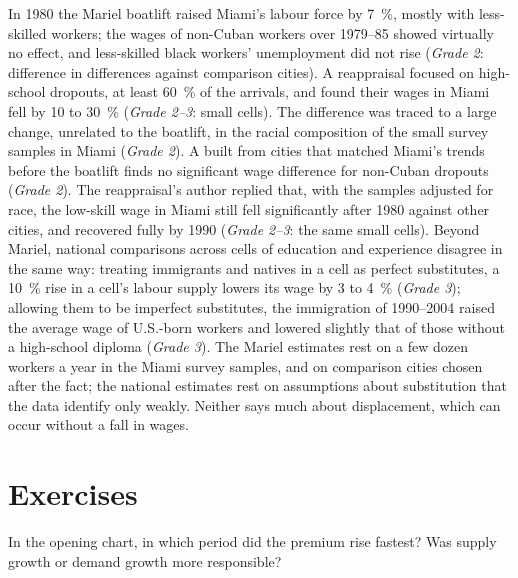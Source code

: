 \begin{debate}
In 1980 the Mariel boatlift raised Miami's labour force by 7~\%, mostly with
less-skilled workers; the wages of non-Cuban workers over 1979--85 showed virtually no
effect, and less-skilled black workers' unemployment did not rise (\emph{Grade 2}:
difference in differences against comparison cities). %
A reappraisal focused on high-school dropouts, at least 60~\% of the arrivals, and found
their wages in Miami fell by 10 to 30~\% (\emph{Grade 2--3}: small cells). %
The difference was traced to a large change, unrelated to the boatlift, in the racial
composition of the small survey samples in Miami (\emph{Grade 2}). %
A  built from cities that matched Miami's trends before the
boatlift finds no significant wage difference for non-Cuban dropouts (\emph{Grade
2}). %
The reappraisal's author replied that, with the samples adjusted for race, the
low-skill wage in Miami still fell significantly after 1980 against other cities,
and recovered fully by 1990 (\emph{Grade 2--3}: the same small cells). %
Beyond Mariel, national comparisons across cells of education and experience
disagree in the same way: treating immigrants and natives in a cell as perfect
substitutes, a 10~\% rise in a cell's labour supply lowers its wage by 3 to 4~\%
(\emph{Grade 3}); allowing them to be imperfect substitutes, the immigration of
1990--2004 raised the average wage of U.S.-born workers and lowered slightly that of
those without a high-school diploma (\emph{Grade 3}). %
The Mariel estimates rest on a few dozen workers a year in the Miami survey
samples, and on comparison cities chosen after the fact; the national estimates rest
on assumptions about substitution that the data identify only weakly. Neither says
much about displacement, which can occur without a fall in wages.
\end{debate}

\section{Exercises}\label{sec:b3:wage-structure:exercises}

\begin{exercise}[$\star$]\label{exo:b3:wage-structure:1}
In the opening chart, in which period did the premium rise fastest? Was supply
growth or demand growth more responsible?
\end{exercise}

